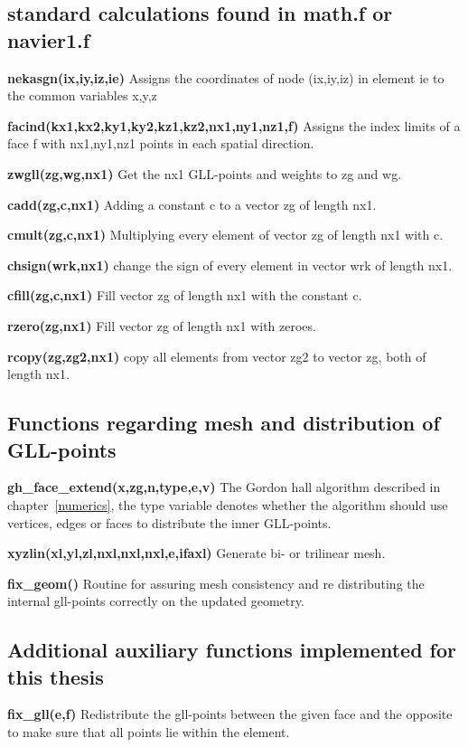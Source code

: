 \subsection{standard calculations found in math.f or navier1.f}

\textbf{nekasgn(ix,iy,iz,ie) } Assigns the coordinates of node 
    (ix,iy,iz) in element ie to the common variables x,y,z 

\textbf{facind(kx1,kx2,ky1,ky2,kz1,kz2,nx1,ny1,nz1,f) } 
Assigns the index limits of a face f with nx1,ny1,nz1 points in each spatial direction.

\textbf{zwgll(zg,wg,nx1)} Get the nx1 GLL-points and weights to zg and wg.

\textbf{cadd(zg,c,nx1)} Adding a constant c to a vector zg of length nx1.

\textbf{cmult(zg,c,nx1)} Multiplying every element of vector zg of length nx1 with c.

\textbf{chsign(wrk,nx1)} change the sign of every element in vector wrk of length nx1.

\textbf{cfill(zg,c,nx1)}  Fill vector zg of length nx1 with the constant c.

\textbf{rzero(zg,nx1) } Fill vector zg of length nx1 with zeroes.

\textbf{rcopy(zg,zg2,nx1) } copy all elements from vector zg2 to vector zg, both of length nx1.

\subsection{Functions regarding mesh and distribution of GLL-points}

\textbf{gh\_face\_extend(x,zg,n,type,e,v)}  The Gordon hall algorithm described in chapter~\ref{numerics}, the type variable denotes whether the 
algorithm should use vertices, edges or faces to distribute the inner GLL-points. 

\textbf{xyzlin(xl,yl,zl,nxl,nxl,nxl,e,ifaxl)} Generate bi- or trilinear mesh.

\textbf{fix\_geom()} Routine for assuring mesh consistency and re distributing the internal  gll-points correctly on the updated geometry.

\subsection{Additional auxiliary functions implemented for this thesis}

\textbf{fix\_gll(e,f)} Redistribute the gll-points between the given face and the opposite to make sure that all points lie within the element.

